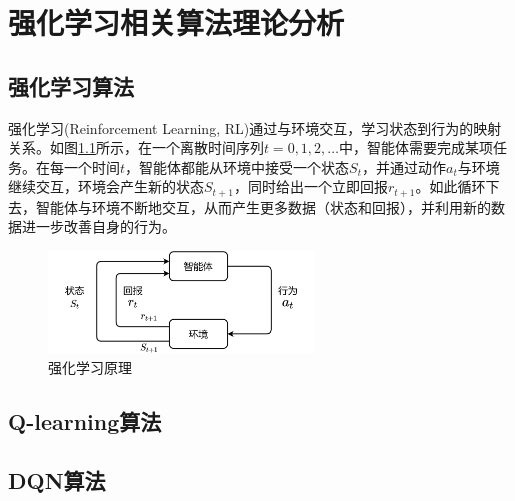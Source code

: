 %
%
%
%
%

\chapter{强化学习相关算法理论分析}

\section{强化学习算法}

强化学习(Reinforcement Learning, RL)通过与环境交互，学习状态到行为的映射关系。如图\ref{强化学习原理}所示，在一个离散时间序列$t=0,1,2,… $中，智能体需要完成某项任务。在每一个时间$t$，智能体都能从环境中接受一个状态$S_t$，并通过动作$a_t$与环境继续交互，环境会产生新的状态$S_{t+1}$，同时给出一个立即回报$r_{t+1}$。如此循环下去，智能体与环境不断地交互，从而产生更多数据（状态和回报），并利用新的数据进一步改善自身的行为。


\begin{figure}[htbp]
  \vspace{13pt} %
  \centering
  \includegraphics[width=0.63\textwidth]{images/chapter2/RL_struction.png}
  \caption{强化学习原理}\label{强化学习原理} %
\end{figure}

\section{Q-learning算法}

\section{DQN算法}


